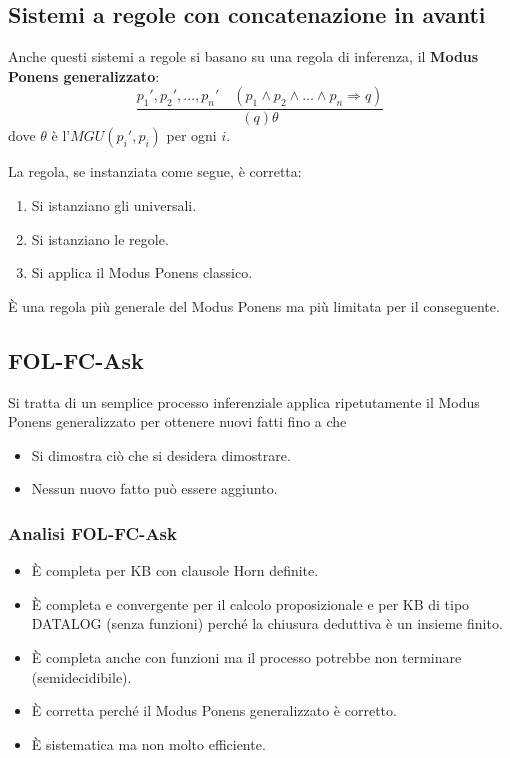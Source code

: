 \subsection{Sistemi a regole con concatenazione in avanti}
Anche questi sistemi a regole si basano su una regola di inferenza, il \textbf{Modus Ponens generalizzato}:
\[ \frac{p_1', p_2', \dots, p_n' \quad (p_1 \wedge p_2 \wedge \dots \wedge p_n \Rightarrow q)}{(q)\theta} \]
dove $\theta$ \`e l'$MGU(p_i', p_i)$ per ogni $i$.

La regola, se instanziata come segue, \`e corretta:
\begin{enumerate}
	\item Si istanziano gli universali.
	\item Si istanziano le regole.
	\item Si applica il Modus Ponens classico.
\end{enumerate}
\`E una regola pi\`u generale del Modus Ponens ma pi\`u limitata per il conseguente.

\subsection{FOL-FC-Ask}
Si tratta di un semplice processo inferenziale applica ripetutamente il Modus Ponens generalizzato per ottenere
nuovi fatti fino a che
\begin{itemize}
	\item Si dimostra ci\`o che si desidera dimostrare.
	\item Nessun nuovo fatto pu\`o essere aggiunto.
\end{itemize}

\subsubsection{Analisi FOL-FC-Ask}
\begin{itemize}
	\item \`E completa per KB con clausole Horn definite.
	\item \`E completa e convergente per il calcolo proposizionale e per KB di tipo DATALOG (senza funzioni) perch\'e
	      la chiusura deduttiva \`e un insieme finito.
	\item \`E completa anche con funzioni ma il processo potrebbe non terminare (semidecidibile).
	\item \`E corretta perch\'e il Modus Ponens generalizzato \`e corretto.
	\item \`E sistematica ma non molto efficiente.
\end{itemize}

